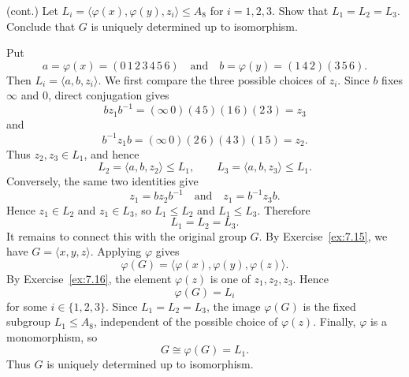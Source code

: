 \documentclass[../Odyssey_Project.tex]{subfiles}
\begin{document}
\begin{exercise}
\label{ex:7.17}
(cont.) Let $L_i = \langle \varphi(x), \varphi(y), z_i \rangle \leq A_8$ for $i = 1, 2, 3$. Show that $L_1 = L_2 = L_3$. Conclude that $G$ is uniquely determined up to isomorphism.
\end{exercise}
\begin{solution}
    Put
    \[
        a=\varphi(x)=(0\,1\,2\,3\,4\,5\,6)
        \quad\text{and}\quad
        b=\varphi(y)=(1\,4\,2)(3\,5\,6).
    \]
    Then $L_i=\langle a,b,z_i\rangle$. We first compare the three possible choices of $z_i$. Since $b$ fixes $\infty$ and $0$, direct conjugation gives
    \[
        bz_1b^{-1}
        =(\infty\,0)(4\,5)(1\,6)(2\,3)
        =z_3
    \]
    and
    \[
        b^{-1}z_1b
        =(\infty\,0)(2\,6)(4\,3)(1\,5)
        =z_2.
    \]
    Thus $z_2,z_3\in L_1$, and hence
    \[
        L_2=\langle a,b,z_2\rangle\leq L_1,
        \qquad
        L_3=\langle a,b,z_3\rangle\leq L_1.
    \]
    Conversely, the same two identities give
    \[
        z_1=bz_2b^{-1}
        \quad\text{and}\quad
        z_1=b^{-1}z_3b.
    \]
    Hence $z_1\in L_2$ and $z_1\in L_3$, so $L_1\leq L_2$ and $L_1\leq L_3$. Therefore
    \[
        L_1=L_2=L_3.
    \]
    It remains to connect this with the original group $G$. By Exercise~\ref{ex:7.15}, we have $G=\langle x,y,z\rangle$. Applying $\varphi$ gives
    \[
        \varphi(G)=\langle \varphi(x),\varphi(y),\varphi(z)\rangle.
    \]
    By Exercise~\ref{ex:7.16}, the element $\varphi(z)$ is one of $z_1,z_2,z_3$. Hence
    \[
        \varphi(G)=L_i
    \]
    for some $i\in\{1,2,3\}$. Since $L_1=L_2=L_3$, the image $\varphi(G)$ is the fixed subgroup $L_1\leq A_8$, independent of the possible choice of $\varphi(z)$. Finally, $\varphi$ is a monomorphism, so
    \[
        G\cong \varphi(G)=L_1.
    \]
    Thus $G$ is uniquely determined up to isomorphism.
\end{solution}
\end{document}
